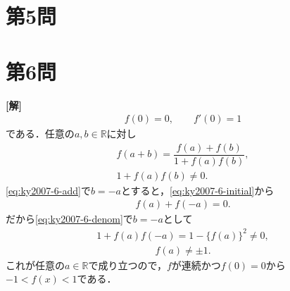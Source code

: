 \documentclass[../main.tex]{subfiles}
\begin{document}
\section*{第5問}

\newpage
\newpage

\section*{第6問}

{\bf [解]}
\begin{align}f(0)=0,\qquad f'(0)=1\label{eq:ky2007-6-initial}
\end{align}
である．任意の$a,b\in\mathbb{R}$に対し
\begin{align}
  f(a+b)=\dfrac{f(a)+f(b)}{1+f(a)f(b)},\label{eq:ky2007-6-add}\\
  1+f(a)f(b)\ne0.\label{eq:ky2007-6-denom}
\end{align}
\cref{eq:ky2007-6-add}で$b=-a$とすると，\cref{eq:ky2007-6-initial}から
\begin{align}f(a)+f(-a)=0.
\end{align}
だから\cref{eq:ky2007-6-denom}で$b=-a$として
\begin{align}1+f(a)f(-a)=1-\{f(a)\}^2\ne0,
\end{align}
\begin{align}f(a)\ne\pm1.
\end{align}
これが任意の$a\in\mathbb{R}$で成り立つので，$f$が連続かつ$f(0)=0$から
$-1<f(x)<1$である．
\end{document}

